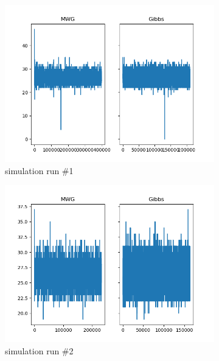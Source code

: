 \begin{figure}[H]
    \centering
    \begin{subfigure}{.3\textwidth}
    	\centering
        \includegraphics[width=\linewidth]{../../plots/Trace_post_burnin_M2_N50_NMCMC1_seed0_diffind2.png}
        \caption{simulation run \#1}
    \end{subfigure}
    \begin{subfigure}{.3\textwidth}
        \centering
    	\includegraphics[width=\linewidth]{../../plots/Trace_post_burnin_M2_N50_NMCMC1_seed1_diffind2.png}
    	\caption{simulation run \#2}
	\end{subfigure}
	\begin{subfigure}{.3\textwidth}
	    \centering

\end{subfigure}
\end{figure}
